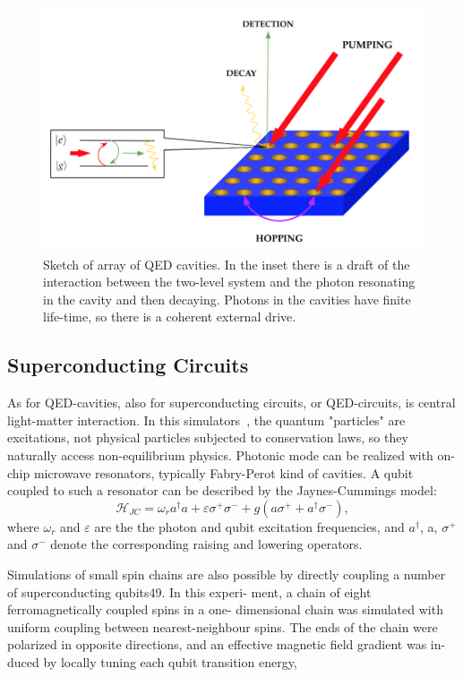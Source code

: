 \begin{figure}
    \centering
    \includegraphics[scale=0.7]{Figures/QED_cavity.png}
    \caption{Sketch of array of QED cavities. In the inset there is a draft of the interaction between the two-level system and the photon resonating in the cavity and then decaying. Photons in the cavities have finite life-time, so there is a coherent external drive.}
    \label{fig:QED_cavities}
\end{figure}


\subsection{Superconducting Circuits}
As for QED-cavities, also for superconducting circuits, or QED-circuits, is central light-matter interaction. In this simulators~\cite{supercircuitsQED}, the quantum "particles" are excitations, not physical particles subjected to conservation laws, so they naturally access non-equilibrium physics. Photonic mode can be realized with on-chip microwave resonators, typically Fabry-Perot kind of cavities. A qubit coupled to such a resonator can be described by the Jaynes-Cummings model:
\begin{equation}
    \mathcal{H}_{JC} = \omega_r a^{\dagger}a+ \varepsilon\sigma^+\sigma^- + g(a\sigma^+ + a^{\dagger}\sigma^-),
\end{equation}
where $\omega_r$ and $\varepsilon$ are the the photon and qubit excitation frequencies, and $a^{\dagger}$, a, $\sigma^+$ and $\sigma^-$ denote the corresponding raising and lowering operators.

Simulations of small spin chains are also possible by directly coupling a number of superconducting qubits49. In this experi- ment, a chain of eight ferromagnetically coupled spins in a one- dimensional chain was simulated with uniform coupling between nearest-neighbour spins. The ends of the chain were polarized in opposite directions, and an effective magnetic field gradient was in- duced by locally tuning each qubit transition energy,

